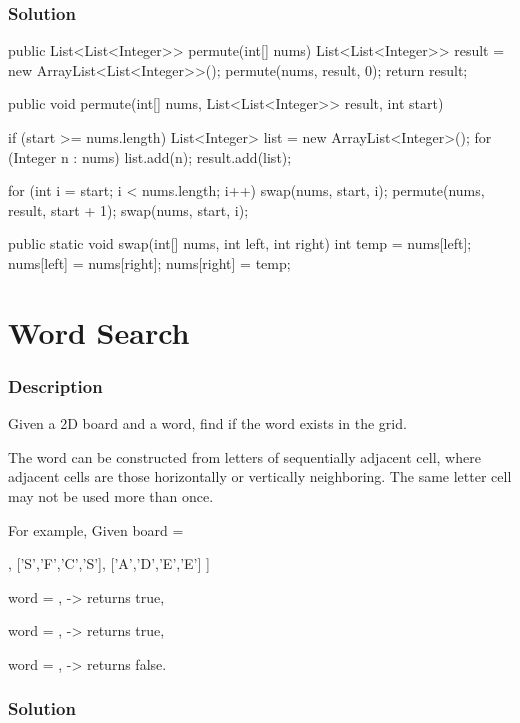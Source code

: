 \subsubsection{Solution}
\begin{Code}
public List<List<Integer>> permute(int[] nums) {
    List<List<Integer>> result = new ArrayList<List<Integer>>();
    permute(nums, result, 0);
    return result;
}

public void permute(int[] nums, List<List<Integer>> result, int start) {
    if (start >= nums.length) {
        List<Integer> list = new ArrayList<Integer>();
        for (Integer n : nums) {
            list.add(n);
        }
        result.add(list);
    }

    for (int i = start; i < nums.length; i++) {
        swap(nums, start, i);
        permute(nums, result, start + 1);
        swap(nums, start, i);
    }
}

public static void swap(int[] nums, int left, int right) {
    int temp = nums[left];
    nums[left] = nums[right];
    nums[right] = temp;
}
\end{Code}

\newpage

\section{Word Search}

\subsubsection{Description}
Given a 2D board and a word, find if the word exists in the grid.

The word can be constructed from letters of sequentially adjacent cell, where adjacent cells are those horizontally or vertically neighboring. The same letter cell may not be used more than once.

For example,
Given board =
\begin{Code}
[
  ['A','B','C','E'],
  ['S','F','C','S'],
  ['A','D','E','E']
]
\end{Code}

word = , -> returns true,

word = , -> returns true,

word = , -> returns false.

\subsubsection{Solution}

